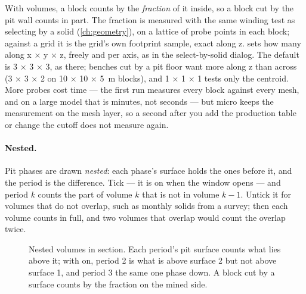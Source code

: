With volumes, a block counts by the \emph{fraction} of it inside, so a block cut by the pit wall counts in part. The fraction is measured with the same winding test as selecting by a solid (\cref{ch:geometry}), on a lattice of probe points in each block; against a grid it is the grid's own footprint sample, exact along z.  sets how many along x × y × z, freely and per axis, as in the select-by-solid dialog. The default is 3 × 3 × 3, as there; benches cut by a pit floor want more along z than across (3 × 3 × 2 on 10 × 10 × 5~m blocks), and 1 × 1 × 1 tests only the centroid. More probes cost time — the first run measures every block against every mesh, and on a large model that is minutes, not seconds — but micro keeps the measurement on the mesh layer, so a second  after you add the production table or change the cutoff does not measure again.

\paragraph{Nested.} Pit phases are drawn \emph{nested}: each phase's surface holds the ones before it, and the period is the difference. Tick  — it is on when the window opens — and period $k$ counts the part of volume $k$ that is not in volume $k-1$. Untick it for volumes that do not overlap, such as monthly solids from a survey; then each volume counts in full, and two volumes that overlap would count the overlap twice.

\begin{figure}[htbp]\centering
{}
\caption{Nested volumes in section. Each period's pit surface counts what lies above it; with  on, period 2 is what is above surface 2 but not above surface 1, and period 3 the same one phase down. A block cut by a surface counts by the fraction on the mined side.}\label{fig:factors-nested}
\end{figure}

